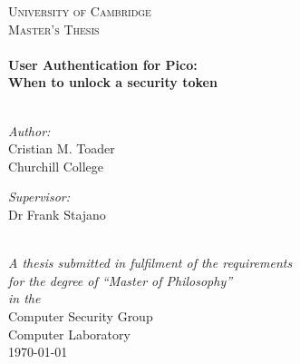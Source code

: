\documentclass[11pt, a4paper, oneside]{Thesis} %
\begin{document}
\begin{titlepage}
\begin{center}

\textsc{\LARGE University of Cambridge}\\[1.5cm] %
\textsc{\Large Master's Thesis}\\[0.5cm] %

\HRule \\[0.4cm] %
{\huge \bfseries User Authentication for Pico: \\ When to unlock a security token}\\[0.4cm] %
\HRule \\[1.5cm] %
 
\begin{minipage}{0.4\textwidth}
\begin{flushleft} \large
\emph{Author:}\\
{Cristian M. Toader\\ Churchill College} %
\end{flushleft}
\end{minipage}
\begin{minipage}{0.4\textwidth}
\begin{flushright} \large
\emph{Supervisor:} \\
Dr Frank Stajano
\end{flushright}
\end{minipage}\\[3cm]
 
\large \textit{A thesis submitted in fulfilment of the requirements\\ for the degree of ``Master of Philosophy''}\\[0.3cm] %
\textit{in the}\\[0.4cm]
Computer Security Group \\ Computer Laboratory \\[2cm] %
 
{\large \today}\\[4cm] %
 
\vfill
\end{center}

\end{titlepage}

\end{document}
